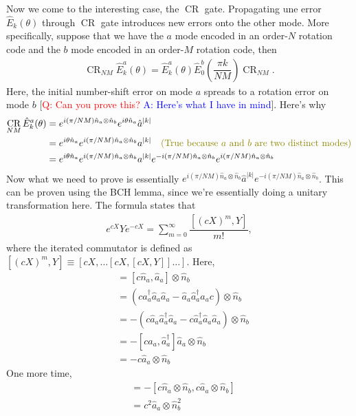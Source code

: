 \documentclass{article}
\DeclareMathOperator{\CR}{\text{CR}}
\begin{document}
Now we come to the interesting case, the $\CR$ gate. Propagating une error $\hat{E}_k(\theta)$ through $\CR$ gate introduces new errors onto the other mode. More specifically, suppose that we have the $a$ mode encoded in an order-$N$ rotation code and the $b$ mode encoded in an order-$M$ rotation code, then
\begin{align}
    \CR_{NM} \hat{E}^a_k(\theta) = \hat{E}^a_k(\theta)\hat{E}^b_0\left(\dfrac{\pi k}{NM}\right)\CR_{NM}.
\end{align}
Here, the initial number-shift error on mode $a$ spreads to a rotation error on mode $b$ [\textcolor{red}{Q: Can you prove this?} \textcolor{blue}{A: Here's what I have in mind}]. Here's why
\begin{align}
    \CR_{NM} \hat{E}^a_k(\theta)&= e^{i(\pi/NM)\hat{n}_a\otimes\hat{n}_b}e^{i\theta\hat{n}_a}\hat{a}^{|k|}\\
    &=e^{i\theta\hat{n}_a}e^{i(\pi/NM)\hat{n}_a\otimes \hat{n}_b}a^{|k|}\quad\text{\textcolor{olive}{(True because $a$ and $b$ are two distinct modes)}}\\
    &=e^{i\theta\hat{n}_a}e^{i(\pi/NM)\hat{n}_a\otimes \hat{n}_b}a^{|k|}e^{-i(\pi/NM)\hat{n}_a\otimes \hat{n}_b}e^{i(\pi/NM)\hat{n}_a\otimes \hat{n}_b}
\end{align}
Now what we need to prove is essentially $e^{i(\pi/NM)\hat{n}_a\otimes\hat{n}_b}\hat{a}^{|k|}e^{-i(\pi/NM)\hat{n}_a\otimes\hat{n}_b}$. This can be proven using the BCH lemma, since we're essentially doing a unitary transformation here. The formula states that 
\begin{align}
    e^{cX}Y e^{-cX}=\sum_{m=0}^{\infty} \dfrac{[(cX)^m, Y]}{m!},
\end{align}
where the iterated commutator is defined as $[(cX)^m, Y]\equiv [cX, \dots [cX,[cX, Y]]\dots]$. Here,
\begin{align}
    [c\hat{n}_a\otimes\hat{n}_b, \hat{a}_a\otimes \hat{\mathbb{1}}_b] &= [c\hat{n}_a, \hat{a}_a]\otimes\hat{n}_b\\
    &=(c\hat{a}_a^\dagger\hat{a}_a\hat{a}_a-\hat{a}_a\hat{a}_a^\dagger\hat{a}_a c)\otimes \hat{n}_b\\
    &=-(c\hat{a}_a\hat{a}_a^\dagger\hat{a}_a-c\hat{a}_a^\dagger\hat{a}_a\hat{a}_a)\otimes \hat{n}_b\\
    &=-[c\hat{a}_a, \hat{a}_a^\dagger]\hat{a}_a\otimes \hat{n}_b\\
    &=-c\hat{a}_a\otimes \hat{n}_b
\end{align}
One more time,
\begin{align}
    [c\hat{n}_a\otimes \hat{n}_b, -c\hat{a}_a\otimes \hat{n}_b]&=-[c\hat{n}_a\otimes \hat{n}_b,c\hat{a}_a\otimes \hat{n}_b]\\
    &=c^2\hat{a}_a\otimes \hat{n}_b^2
\end{align}
\end{document}
